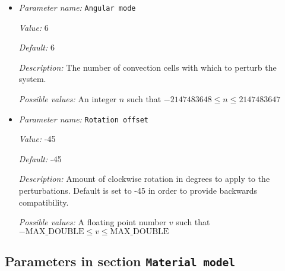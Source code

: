 \begin{itemize}
\item {\it Parameter name:} {\tt Angular mode}
\label{parameters:Initial temperature model/Spherical hexagonal perturbation/Angular mode}
\label{parameters:Initial_20temperature_20model/Spherical_20hexagonal_20perturbation/Angular_20mode}


{\it Value:} 6


{\it Default:} 6


{\it Description:} The number of convection cells with which to perturb the system.


{\it Possible values:} An integer $n$ such that $-2147483648\leq n \leq 2147483647$
\item {\it Parameter name:} {\tt Rotation offset}
\label{parameters:Initial temperature model/Spherical hexagonal perturbation/Rotation offset}
\label{parameters:Initial_20temperature_20model/Spherical_20hexagonal_20perturbation/Rotation_20offset}


{\it Value:} -45


{\it Default:} -45


{\it Description:} Amount of clockwise rotation in degrees to apply to the perturbations. Default is set to -45 in order to provide backwards compatibility.


{\it Possible values:} A floating point number $v$ such that $-\text{MAX\_DOUBLE} \leq v \leq \text{MAX\_DOUBLE}$
\end{itemize}

\subsection{Parameters in section \tt Material model}
\label{parameters:Material_20model}

